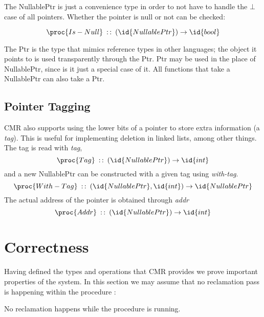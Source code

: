 The NullablePtr is just a convenience type in order to not have to handle the $\bot$ case of all
pointers. Whether the pointer is null or not can be checked:

\begin{equation}\label{eq:nullable-is-null}
  \proc{Is-Null}\typeof (\id{NullablePtr}) \to \id{bool}
\end{equation}

The Ptr is the type that mimics reference types in other languages; the object it points to is used
transparently through the Ptr. Ptr may be used in the place of NullablePtr, since is it just a
special case of it. All functions that take a NullablePtr can also take a Ptr.



\subsection{Pointer Tagging\label{sec:cmr-pointer-tagging}}

CMR also supports using the lower bits of a pointer to store extra information (a \emph{tag}). This
is useful for implementing deletion in linked lists, among other things. The tag is read with
\emph{tag},
\begin{equation}\label{eq:ptr-tag}
  \proc{Tag}\typeof{} (\id{NullablePtr}) \to \id{int}
\end{equation}
and a new NullablePtr can be constructed with a given tag using \emph{with-tag}.
\begin{equation}\label{eq:ptr-with-tag}
  \proc{With-Tag}\typeof{} (\id{NullablePtr}, \id{int}) \to \id{NullablePtr}
\end{equation}
The actual address of the pointer is obtained through \emph{addr}
\begin{equation}\label{eq:ptr-addr}
  \proc{Addr}\typeof{} (\id{NullablePtr}) \to \id{int}
\end{equation}



\section{Correctness\label{sec:cmr-correctness}}

Having defined the types and operations that CMR provides we prove important properties of the
system. In this section we may assume that no reclamation pass is happening within the procedure
:

\begin{claim}
  \label{def:load-atomic-no-reclamation}
  No reclamation happens while the procedure  is running.
\end{claim}

